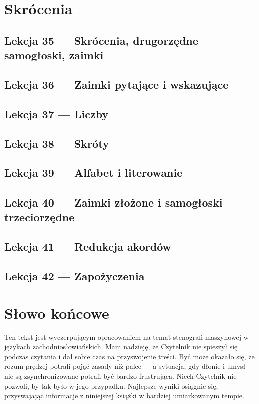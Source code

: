\documentclass[12p, oneside]{book}
\begin{document}
\chapter{Skrócenia}
\newpage
\section{Lekcja 35 --- Skrócenia, drugorzędne samogłoski, zaimki}
\newpage
\section{Lekcja 36 --- Zaimki pytające i wskazujące}
\newpage
\section{Lekcja 37 --- Liczby}
\newpage
\section{Lekcja 38 --- Skróty}
\newpage
\section{Lekcja 39 --- Alfabet i literowanie}
\newpage
\section{Lekcja 40 --- Zaimki złożone i samogłoski trzeciorzędne}
\newpage
\section{Lekcja 41 --- Redukcja akordów}
\newpage
\section{Lekcja 42 --- Zapożyczenia}
\newpage
\chapter{Słowo końcowe}
Ten tekst jest wyczerpującym opracowaniem na temat stenografi maszynowej w językach zachodniosłowiańskich. Mam nadzieję, ze Czytelnik nie spieszył się podczas czytania i dał sobie czas na przyswojenie treści. Być może okazało się, że rozum prędzej potrafi pojąć zasady niż palce --- a sytuacja, gdy dłonie i umysł nie są zsynchronizowane potrafi być bardzo frustrująca. Niech Czytelnik nie pozwoli, by tak było w jego przypadku. Najlepsze wyniki osiągnie się, przyswajając informacje z niniejszej książki w bardziej umiarkowanym tempie.
\end{document}
